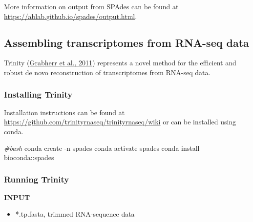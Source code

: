 \documentclass[
  12pt,
]{article}
\newenvironment{Shaded}{\begin{snugshade}}{\end{snugshade}}
\newcommand{\AttributeTok}[1]{\textcolor[rgb]{0.13,0.29,0.53}{#1}}
\newcommand{\CommentTok}[1]{\textcolor[rgb]{0.56,0.35,0.01}{\textit{#1}}}
\newcommand{\ExtensionTok}[1]{#1}
\newcommand{\NormalTok}[1]{#1}
\providecommand{\tightlist}{%
  \setlength{\itemsep}{0pt}\setlength{\parskip}{0pt}}
\begin{document}
More information on output from SPAdes can be found at \url{https://ablab.github.io/spades/output.html}.

\hypertarget{assembling-transcriptomes-from-rna-seq-data}{%
\subsection{Assembling transcriptomes from RNA-seq data}\label{assembling-transcriptomes-from-rna-seq-data}}

Trinity (\protect\hyperlink{ref-Grabherr2011}{Grabherr et al., 2011}) represents a novel method for the efficient and robust de novo reconstruction of transcriptomes from RNA-seq data.

\hypertarget{installing-trinity}{%
\subsubsection{Installing Trinity}\label{installing-trinity}}

Installation instructions can be found at \url{https://github.com/trinityrnaseq/trinityrnaseq/wiki} or can be installed using conda.

\begin{Shaded}
\begin{Highlighting}[]
\CommentTok{\#bash}
\ExtensionTok{conda}\NormalTok{ create }\AttributeTok{{-}n}\NormalTok{ spades}
\ExtensionTok{conda}\NormalTok{ activate spades}
\ExtensionTok{conda}\NormalTok{ install bioconda::spades}
\end{Highlighting}
\end{Shaded}

\hypertarget{running-trinity}{%
\subsubsection{Running Trinity}\label{running-trinity}}

\textbf{INPUT}

\begin{itemize}
\tightlist
\item
  *.tp.fasta, trimmed RNA-sequence data
\end{itemize}
\end{document}
